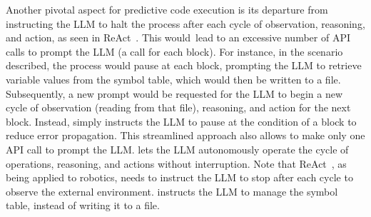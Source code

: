 Another pivotal aspect for predictive code
execution is its departure from instructing the LLM
to halt the process after each cycle of observation, reasoning, and
action, as seen in ReAct~\cite{yao2023react}. This would~lead
to an excessive number of API calls to prompt the LLM (a call for each
block). For instance, in the scenario described, the process would
pause at each block, prompting the LLM to retrieve variable values
from the symbol table, which would then be written to a
file. Subsequently, a new prompt would be requested for the LLM to
begin a new cycle of observation (reading from that file),
reasoning, and action for the next block. Instead, {\orca}
simply instructs the LLM to pause at the condition of a block to
reduce error propagation. This streamlined approach also allows
{\orca} to make only one API call to prompt the LLM. {\orca} lets the LLM autonomously operate the cycle of operations,
reasoning, and actions without interruption. Note that
ReAct~\cite{yao2023react}, as being applied to robotics, needs
to instruct the LLM to stop after each cycle to observe the external
environment. {\orca} instructs the LLM to manage the symbol table,
instead of writing it to a file.



